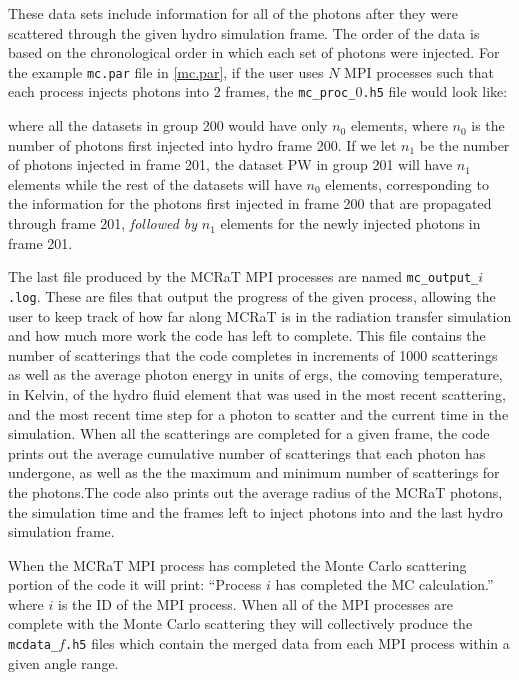 \documentclass[12pt,a4paper]{article}
\begin{document}
These data sets include information for all of the photons after they were scattered through the given hydro simulation frame. The order of the data is based on the chronological order in which each set of photons were injected. For the example \texttt{mc.par} file in \autoref{mc.par}, if the user uses $N$ MPI processes such that each process injects photons into 2 frames, the \texttt{mc\_proc\_$0$.h5} file would look like:
\begin{figure}[h!]
 \end{figure}
 
\newpage where all the datasets in group 200 would have only $n_{0}$ elements, where $n_{0}$ is the number of photons first injected into hydro frame 200. If we let $n_{1}$ be the number of photons injected in frame 201, the dataset PW in group 201 will have $n_{1}$ elements while the rest of the datasets will have $n_{0}$ elements, corresponding to the information for the photons first injected in frame 200 that are propagated through frame 201, \textit{followed by} $n_{1}$ elements for the newly injected photons in frame 201. 

The last file produced by the MCRaT MPI processes are named \texttt{mc\_output\_$i$.log}. These are files that output the progress of the given process, allowing the user to keep track of how far along MCRaT is in the radiation transfer simulation and how much more work the code has left to complete. This file contains the number of scatterings that the code completes in increments of 1000 scatterings as well as the average photon energy in units of ergs, the comoving temperature, in Kelvin, of the hydro fluid element that was used in the most recent scattering, and the most recent time step for a photon to scatter and the current time in the simulation. When all the scatterings are completed for a given frame, the code prints out the average cumulative number of scatterings that each photon has undergone, as well as the the maximum and minimum number of scatterings for the photons.The code also prints out the average radius of the MCRaT photons, the simulation time and the frames left to inject photons into and the last hydro simulation frame.

When the MCRaT MPI process has completed the Monte Carlo scattering portion of the code it will print: ``Process $i$ has completed the MC calculation.'' where $i$ is the ID of the MPI process. When all of the MPI processes are complete with the Monte Carlo scattering they will collectively produce the \texttt{mcdata\_$f$.h5} files which contain the merged data from each MPI process within a given angle range.
\end{document}
